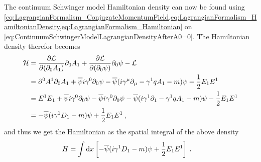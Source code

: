 \documentclass[../main.tex]{subfiles} %
\begin{document}
The continuum Schwinger model Hamiltonian density can now be found using \cref{eq:LagrangianFormalism_ConjugateMomentumField,eq:LagrangianFormalism_HamiltonianDensity,eq:LagrangianFormalism_Hamiltonian} on \cref{eq:ContinuumSchwingerModelLagrangianDensityAfterA0=0}. The Hamiltonian density therefor becomes
\begin{align} \label{eq:ContinuumSchwingerModelHamiltonianDensity}
\begin{split}
    \mathcal{H} &= \pdv{\mathcal{L}}{(\partial_0 A_1)} \partial_0 A_1 + \pdv{\mathcal{L}}{(\partial_0 \psi)} \partial_0 \psi - \mathcal{L} \\
        &= \partial^0 A^1 \partial_0 A_1 + \overline{\psi} i \gamma^0 \partial_0 \psi - \overline{\psi} (i \gamma^\mu \partial_\mu - \gamma^1 q A_1 - m) \psi - \frac{1}{2} E_1 E^1 \\
        &= E^1 E_1 + \overline{\psi} i \gamma^0 \partial_0 \psi - \overline{\psi} i \gamma^0 \partial_0 \psi - \overline{\psi} (i \gamma^1 \partial_1 - \gamma^1 q A_1 - m) \psi - \frac{1}{2} E_1 E^1 \\
        &= - \overline{\psi} (i \gamma^1 D_1 - m) \psi + \frac{1}{2} E_1 E^1 \: ,
\end{split}
\end{align}
and thus we get the Hamiltonian as the spatial integral of the above density
\begin{align} \label{eq:ContinuumSchwingerModelHamiltonian}
    H &= \int \dd{x} \left[ - \overline{\psi} (i \gamma^1 D_1 - m) \psi + \frac{1}{2} E_1 E^1 \right] \: .
\end{align}
\end{document}
